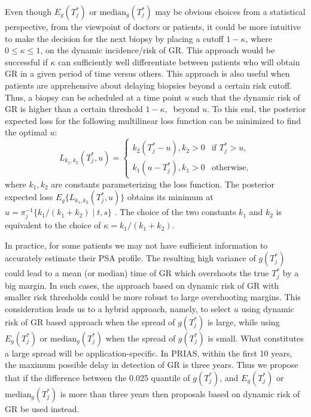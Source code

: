Even though $E_g(T^*_j)$ or $\mbox{median}_g(T^*_j)$ may be obvious choices from a statistical perspective, from the viewpoint of doctors or patients, it could be more intuitive to make the decision for the next biopsy by placing a cutoff $1 - \kappa$, where $0 \leq \kappa \leq 1$, on the dynamic incidence/risk of GR. This approach would be successful if $\kappa$ can sufficiently well differentiate between patients who will obtain GR in a given period of time versus others. This approach is also useful when patients are apprehensive about delaying biopsies beyond a certain risk cutoff. Thus, a biopsy can be scheduled at a time point $u$ such that the dynamic risk of GR is higher than a certain threshold $1 - \kappa,\ $ beyond $u$. To this end, the posterior expected loss for the following multilinear loss function can be minimized to find the optimal $u$:
\begin{equation*}
\label{eq : loss_dynamic_risk}
L_{k_1, k_2}(T^*_j, u) =
    \begin{cases}
      k_2(T^*_j-u), k_2>0 & \text{if } T^*_j > u,\\
      k_1(u-T^*_j), k_1>0 & \text{otherwise},
    \end{cases}       
\end{equation*}
where $k_1, k_2$ are constants parameterizing the loss function. The posterior expected loss $E_g\big\{L_{k_1, k_2}(T^*_j, u)\big\}$ obtains its minimum at $u = \pi_j^{-1}\big\{k_1/{(k_1 + k_2)} \mid t,s \big\}$ \citep{robertBayesianChoice}. The choice of the two constants $k_1$ and $k_2$ is equivalent to the choice of $\kappa = {k_1}/{(k_1 + k_2)}$.

In practice, for some patients we may not have sufficient information to accurately estimate their PSA profile. The resulting high variance of $g(T^*_j)$ could lead to a mean (or median) time of GR which overshoots the true $T_j^*$ by a big margin. In such cases, the approach based on dynamic risk of GR with smaller risk thresholds could be more robust to large overshooting margins. This consideration leads us to a hybrid approach, namely, to select $u$ using dynamic risk of GR based approach when the spread of $g(T_j^*)$ is large, while using $E_g(T^*_j)$ or $\mbox{median}_g(T^*_j)$ when the spread of $g(T_j^*)$ is small. What constitutes a large spread will be application-specific. In PRIAS, within the first 10 years, the maximum possible delay in detection of GR is three years. Thus we propose that if the difference between the 0.025 quantile of $g(T^*_j)$, and $E_g(T^*_j)$ or $\mbox{median}_g(T^*_j)$ is more than three years then proposals based on dynamic risk of GR be used instead.